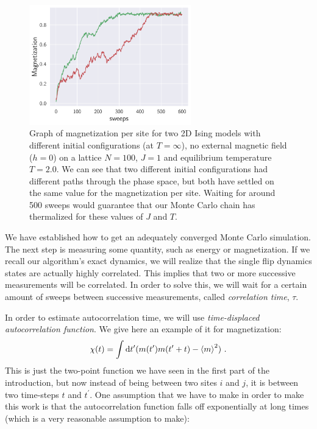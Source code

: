\begin{figure}[H]
	\centering
	\includegraphics[width=7cm]{figures/introduction/thermalizationTwoStarts.pdf}
	\caption{Graph of magnetization per site for two 2D Ising models with different initial configurations (at $T=\infty$), no external magnetic field ($h=0$) on a lattice $N=100$, $J=1$ and equilibrium temperature $T=2.0$. We can see that two different initial configurations had different paths through the phase space, but both have settled on the same value for the magnetization per site. Waiting for around 500 sweeps would guarantee that our Monte Carlo chain has thermalized for these values of $J$ and $T$.}
	\label{gr:themalizationTwoRuns}
\end{figure}
\par
We have established how to get an adequately converged Monte Carlo simulation. The next step is measuring some quantity, such as energy or magnetization. If we recall our algorithm's exact dynamics, we will realize that the single flip dynamics states are actually highly correlated. This implies that two or more successive measurements will be correlated. In order to solve this, we will wait for a certain amount of sweeps between successive measurements, called \textit{correlation time}, $\tau$.
\par
In order to estimate autocorrelation time, we will use \textit{time-displaced autocorrelation function}. We give here an example of it for magnetization:
\begin{equation}
	\chi(t) = \int \dd t^\prime (m(t^\prime)m(t^\prime + t) - \expval{m}^2) \ .
	\label{eq:autocorrfunc}
\end{equation}
This is just the two-point function we have seen in the first part of the introduction, but now instead of being between two sites $i$ and $j$, it is between two time-steps $t$ and $t^\prime$. One assumption that we have to make in order to make this work is that the autocorrelation function falls off exponentially at long times (which is a very reasonable assumption to make):
